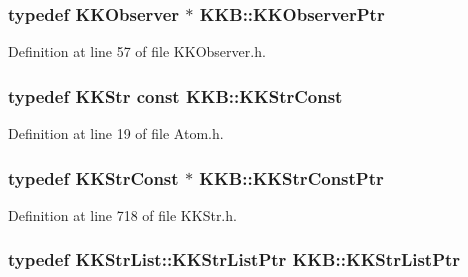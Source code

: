 \subsubsection[{\texorpdfstring{K\+K\+Observer\+Ptr}{KKObserverPtr}}]{\setlength{\rightskip}{0pt plus 5cm}typedef {\bf K\+K\+Observer} $\ast$ {\bf K\+K\+B\+::\+K\+K\+Observer\+Ptr}}\hypertarget{namespace_k_k_b_ae230fa69820db86befff70da824c5b2b}{}\label{namespace_k_k_b_ae230fa69820db86befff70da824c5b2b}


Definition at line 57 of file K\+K\+Observer.\+h.

\subsubsection[{\texorpdfstring{K\+K\+Str\+Const}{KKStrConst}}]{\setlength{\rightskip}{0pt plus 5cm}typedef {\bf K\+K\+Str} const {\bf K\+K\+B\+::\+K\+K\+Str\+Const}}\hypertarget{namespace_k_k_b_a099e3e87bc82447b38ec025e33222cf5}{}\label{namespace_k_k_b_a099e3e87bc82447b38ec025e33222cf5}


Definition at line 19 of file Atom.\+h.

\subsubsection[{\texorpdfstring{K\+K\+Str\+Const\+Ptr}{KKStrConstPtr}}]{\setlength{\rightskip}{0pt plus 5cm}typedef {\bf K\+K\+Str\+Const} $\ast$ {\bf K\+K\+B\+::\+K\+K\+Str\+Const\+Ptr}}\hypertarget{namespace_k_k_b_a46f665ec17615c856eff3d21f78bed5c}{}\label{namespace_k_k_b_a46f665ec17615c856eff3d21f78bed5c}


Definition at line 718 of file K\+K\+Str.\+h.

\subsubsection[{\texorpdfstring{K\+K\+Str\+List\+Ptr}{KKStrListPtr}}]{\setlength{\rightskip}{0pt plus 5cm}typedef {\bf K\+K\+Str\+List\+::\+K\+K\+Str\+List\+Ptr} {\bf K\+K\+B\+::\+K\+K\+Str\+List\+Ptr}}\hypertarget{namespace_k_k_b_a8f5f50672f37857425120831223888aa}{}\label{namespace_k_k_b_a8f5f50672f37857425120831223888aa}


